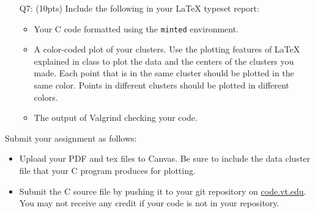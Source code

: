 \begin{itemize}
    \item[Q7:] (10pts) Include the following in your \LaTeX{} typeset report:
\begin{itemize}
    \item Your C code formatted using the \texttt{minted} environment.
    \item A color-coded plot of your clusters.
    Use the plotting features of \LaTeX{} explained in class to plot the data and the centers of the clusters you made.
    Each point that is in the same cluster should be plotted in the same color.
    Points in different clusters should be plotted in different colors.
    \item The output of Valgrind checking your code.
\end{itemize}
\end{itemize}
Submit your assignment as follows:
\begin{itemize}
    \item Upload your PDF and tex files to Canvas.
    Be sure to include the data cluster file that your C program produces for plotting.
    \item Submit the C source file by pushing it to your git repository on \href{http://code.vt.edu}{code.vt.edu}.
    You may not receive any credit if your code is not in your repository.
\end{itemize}